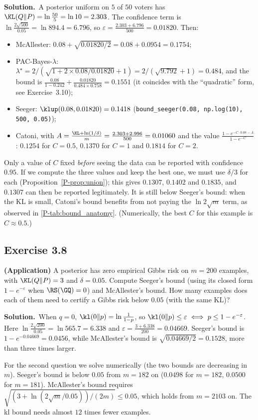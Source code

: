 \documentclass[11pt]{article}
\newcommand{\statement}[1]{\begin{tcolorbox}[enhanced,breakable,colback=black!3,colframe=black!25,boxrule=0.4pt,sharp corners,fontupper=\itshape\small]#1\end{tcolorbox}}
\newcommand{\exo}[1]{\Needspace{6\baselineskip}\subsection*{Exercise #1}\addcontentsline{toc}{subsection}{Exercise #1}}
\newcommand{\sol}{\noindent\textbf{Solution.}\ }
\begin{document}
\sol A posterior uniform on $5$ of $50$ voters has $\KL(Q\|P)=\ln\frac{50}5=\ln10=2.303$. The confidence term is
$\ln\frac{2\sqrt{500}}{0.05}=\ln894.4=6.796$, so $\varepsilon=\frac{2.303+6.796}{500}=0.01820$. Then:
\begin{itemize}
\item McAllester: $0.08+\sqrt{0.01820/2}=0.08+0.0954=0.1754$;
\item PAC-Bayes-$\lambda$: $\lambda^\star=2/(\sqrt{1+2\times0.08/0.01820}+1)=2/(\sqrt{9.792}+1)=0.484$, and the bound is
$\frac{0.08}{1-0.242}+\frac{0.01820}{0.484\times0.758}=0.1551$ (it coincides with the ``quadratic'' form, see Exercise~3.10);
\item Seeger: $\klup(0.08,0.01820)=0.1418$ (\texttt{bound\_seeger(0.08, np.log(10), 500, 0.05)});
\item Catoni, with $A=\frac{\KL+\ln(1/\delta)}m=\frac{2.303+2.996}{500}=0.01060$ and the value $\frac{1-e^{-C\cdot0.08-A}}{1-e^{-C}}$: $0.1254$ for
$C=0.5$, $0.1370$ for $C=1$ and $0.1814$ for $C=2$.
\end{itemize}
Only a value of $C$ fixed \emph{before} seeing the data can be reported with confidence $0.95$. If we compute the three
values and keep the best one, we must use $\delta/3$ for each (Proposition~\ref{P-prop:union}); this gives $0.1307$, $0.1402$ and $0.1835$,
and $0.1307$ can then be reported legitimately. It is still below Seeger's bound: when the KL is small, Catoni's bound
benefits from not paying the $\ln2\sqrt m$ term, as observed in \cref{P-tab:bound_anatomy}. (Numerically, the best
$C$ for this example is $C\approx0.5$.)

\exo{3.8}
\statement{\textbf{(Application)} A posterior has zero empirical Gibbs risk on $m=200$ examples, with $\KL(Q\|P)=3$ and $\delta=0.05$.
Compute Seeger's bound (using its closed form $1-e^{-\varepsilon}$ when $\RS(\GQ)=0$) and McAllester's bound. How many examples does
each of them need to certify a Gibbs risk below $0.05$ (with the same KL)?}

\sol When $q=0$, $\kl(0\|p)=\ln\frac1{1-p}$, so $\kl(0\|p)\leq\varepsilon\iff p\leq1-e^{-\varepsilon}$. Here $\ln\frac{2\sqrt{200}}{0.05}=\ln565.7=6.338$
and $\varepsilon=\frac{3+6.338}{200}=0.04669$. Seeger's bound is $1-e^{-0.04669}=0.0456$, while McAllester's bound is
$\sqrt{0.04669/2}=0.1528$, more than three times larger.

For the second question we solve numerically (the two bounds are decreasing in $m$). Seeger's bound is below $0.05$
from $m=182$ on ($0.0498$ for $m=182$, $0.0500$ for $m=181$). McAllester's bound requires
$\sqrt{(3+\ln(2\sqrt m/0.05))/(2m)}\leq0.05$, which holds from $m=2103$ on. The kl bound needs almost $12$ times fewer examples.
\end{document}
